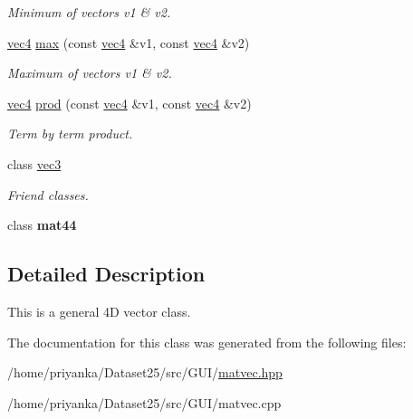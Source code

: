 \begin{DoxyCompactItemize}
\begin{DoxyCompactList}\small\item\em \-Minimum of vectors v1 \& v2. \end{DoxyCompactList}\item 
\hypertarget{classutil_1_1math_1_1vec4_aa72c2f7169e6203b90e757c8978e137d}{\hyperlink{classutil_1_1math_1_1vec4}{vec4} \hyperlink{classutil_1_1math_1_1vec4_aa72c2f7169e6203b90e757c8978e137d}{max} (const \hyperlink{classutil_1_1math_1_1vec4}{vec4} \&v1, const \hyperlink{classutil_1_1math_1_1vec4}{vec4} \&v2)}\label{classutil_1_1math_1_1vec4_aa72c2f7169e6203b90e757c8978e137d}

\begin{DoxyCompactList}\small\item\em \-Maximum of vectors v1 \& v2. \end{DoxyCompactList}\item 
\hypertarget{classutil_1_1math_1_1vec4_a4116968b1fa6cf0a704377e7a7255513}{\hyperlink{classutil_1_1math_1_1vec4}{vec4} \hyperlink{classutil_1_1math_1_1vec4_a4116968b1fa6cf0a704377e7a7255513}{prod} (const \hyperlink{classutil_1_1math_1_1vec4}{vec4} \&v1, const \hyperlink{classutil_1_1math_1_1vec4}{vec4} \&v2)}\label{classutil_1_1math_1_1vec4_a4116968b1fa6cf0a704377e7a7255513}

\begin{DoxyCompactList}\small\item\em \-Term by term product. \end{DoxyCompactList}\end{DoxyCompactItemize}
{\bf }\par
\begin{DoxyCompactItemize}
\item 
\hypertarget{classutil_1_1math_1_1vec4_aa849243c6cd858bbcd88237a8ad16cad}{class \hyperlink{classutil_1_1math_1_1vec4_aa849243c6cd858bbcd88237a8ad16cad}{vec3}}\label{classutil_1_1math_1_1vec4_aa849243c6cd858bbcd88237a8ad16cad}

\begin{DoxyCompactList}\small\item\em \-Friend classes. \end{DoxyCompactList}\item 
\hypertarget{classutil_1_1math_1_1vec4_a6ace441765195dd1c6152260e5661a0a}{class {\bfseries mat44}}\label{classutil_1_1math_1_1vec4_a6ace441765195dd1c6152260e5661a0a}

\end{DoxyCompactItemize}



\subsection{\-Detailed \-Description}
\-This is a general 4\-D vector class. 

\-The documentation for this class was generated from the following files\-:\begin{DoxyCompactItemize}
\item 
/home/priyanka/\-Dataset25/src/\-G\-U\-I/\hyperlink{matvec_8hpp}{matvec.\-hpp}\item 
/home/priyanka/\-Dataset25/src/\-G\-U\-I/matvec.\-cpp\end{DoxyCompactItemize}
